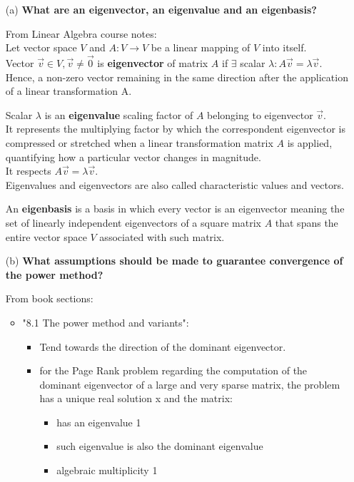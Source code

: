 \documentclass[unicode,11pt,a4paper,oneside,numbers=endperiod,openany]{scrartcl}
\begin{document}
\begin{enumerate}
    \item[(a)] \textbf{What are an eigenvector, an eigenvalue and an eigenbasis?}

        From Linear Algebra course notes: \\
        Let vector space $V$ and $A: V \rightarrow V$ be a linear mapping of $V$ into itself. \\
        Vector $\vec{v} \in V, \vec{v} \neq \vec{0}$ is \textbf{eigenvector} of matrix $A$ if $\exists$ scalar
        $\lambda: A\vec{v} = \lambda\vec{v}$. \\
        Hence, a non-zero vector remaining in the same direction after the application of a linear transformation A.

        Scalar $\lambda$ is an \textbf{eigenvalue} scaling factor of $A$ belonging to eigenvector $\vec{v}$. \\
        It represents the multiplying factor by which the correspondent eigenvector is compressed or stretched when a linear transformation matrix $A$ is applied, quantifying how a particular vector changes in magnitude. \\
        It respects $A\vec{v}=\lambda\vec{v}$.\\
        Eigenvalues and eigenvectors are also called characteristic values and vectors.

        An \textbf{eigenbasis} is a basis in which every vector is an eigenvector meaning the set of linearly independent eigenvectors of a square matrix $A$ that spans the entire vector space $V$ associated with such matrix.


    \item[(b)] \textbf{What assumptions should be made to guarantee convergence of the power method?}

        From book sections:

        \begin{itemize}
            \item "8.1  The power method and variants":
                  \begin{itemize}
                      \item
                            Tend towards the direction of the dominant eigenvector.

                      \item
                            for the Page Rank problem regarding the computation of the dominant eigenvector of a large and very sparse matrix,
                            the problem has a unique real solution x and the matrix:
                            \begin{itemize}
                                \item has an eigenvalue 1
                                \item such eigenvalue is also the dominant eigenvalue
                                \item algebraic multiplicity 1
                            \end{itemize}
                  \end{itemize}


\end{itemize}
\end{enumerate}
\end{document}
